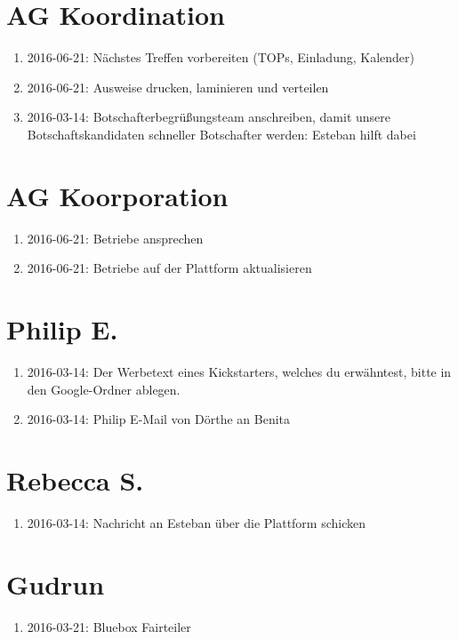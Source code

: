 \documentclass{scrreprt}
\begin{document}
    \section{AG Koordination}
    \begin{enumerate}
    	\item 2016-06-21: Nächstes Treffen vorbereiten (TOPs, Einladung, Kalender)
       	\item 2016-06-21: Ausweise drucken, laminieren und verteilen
       	\item 2016-03-14: Botschafterbegrüßungsteam anschreiben, damit unsere Botschaftskandidaten schneller Botschafter werden: Esteban hilft dabei
    \end{enumerate}
    
    \section{AG Koorporation}
    \begin{enumerate}
    	\item 2016-06-21: Betriebe ansprechen
    	\item 2016-06-21: Betriebe auf der Plattform aktualisieren
    \end{enumerate}
        
    \section{Philip E.}
    \begin{enumerate}
    	\item 2016-03-14: Der Werbetext eines Kickstarters, welches du erwähntest, bitte in den Google-Ordner ablegen. 
    	\item 2016-03-14: Philip E-Mail von Dörthe an Benita
    \end{enumerate}
    
    \section{Rebecca S.}
    \begin{enumerate}
    	\item 2016-03-14: Nachricht an Esteban über die Plattform schicken
    \end{enumerate}
    
    \section{Gudrun}
    \begin{enumerate}
    	\item 2016-03-21: Bluebox Fairteiler
    \end{enumerate}
\end{document}
